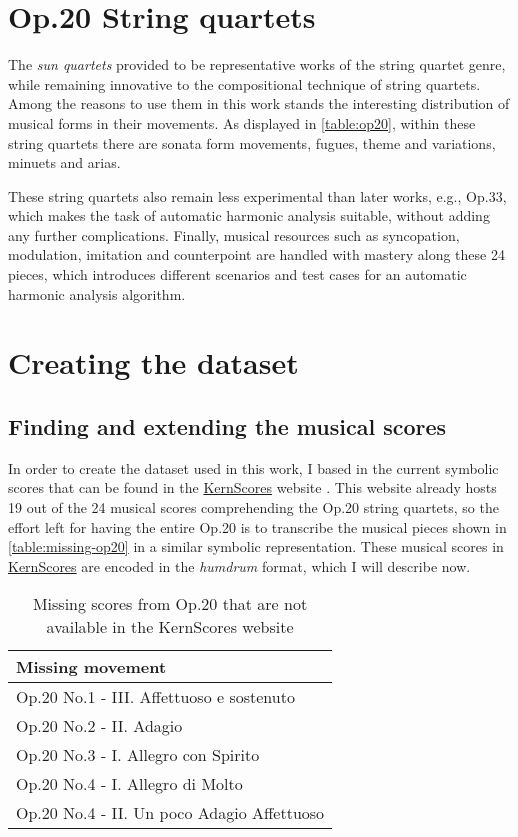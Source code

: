 \section{Op.20 String quartets}
The \emph{sun quartets} provided to be representative works of the string quartet genre, while remaining innovative to the compositional technique of string quartets. Among the reasons to use them in this work stands the interesting distribution of musical forms in their movements. As displayed in \autoref{table:op20}, within these string quartets there are sonata form movements, fugues, theme and variations, minuets and arias.

These string quartets also remain less experimental than later works, e.g., Op.33, which makes the task of automatic harmonic analysis suitable, without adding any further complications. Finally, musical resources such as syncopation, modulation, imitation and counterpoint are handled with mastery along these 24 pieces, which introduces different scenarios and test cases for an automatic harmonic analysis algorithm.

\section{Creating the dataset}
\subsection{Finding and extending the musical scores}
In order to create the dataset used in this work, I based in the current symbolic scores that can be found in the \href{http://kern.ccarh.org/}{KernScores} website \cite{kernscores}. This website already hosts 19 out of the 24 musical scores comprehending the Op.20 string quartets, so the effort left for having the entire Op.20 is to transcribe the musical pieces shown in \autoref{table:missing-op20} in a similar symbolic representation. These musical scores in \href{http://kern.ccarh.org/}{KernScores} are encoded in the \emph{humdrum} format, which I will describe now.

\begin{table}[tbp]
\centering
\begin{tabular}{|l|}
\hline
Missing movement \\ \hline
Op.20 No.1 - III. Affettuoso e sostenuto \\ \hline
Op.20 No.2 - II. Adagio \\ \hline
Op.20 No.3 - I. Allegro con Spirito \\ \hline
Op.20 No.4 - I. Allegro di Molto \\ \hline
Op.20 No.4 - II. Un poco Adagio Affettuoso \\ \hline
\end{tabular}
\caption{Missing scores from Op.20 that are not available in the KernScores website}
\label{table:missing-op20}
\end{table}

